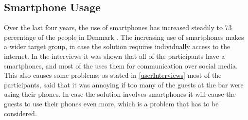 \subsection{Smartphone Usage}
\label{sub:smartphone_usage}

Over the last four years, the use of smartphones has increased steadily to 73 percentage of the people in Denmark \cite{smartphone2014}. The increasing use of smartphones makes a wider target group, in case the solution requires individually access to the internet. In the interviews it was shown that all of the participants have a smartphones, and most of the uses them for communication over social media. This also causes some problems; as stated in \cref{userInterviews} most of the participants, said that it was annoying if too many of the guests at the bar were using their phones. In case the solution involves smartphones it will cause the guests to use their phones even more, which is a problem that has to be considered.

